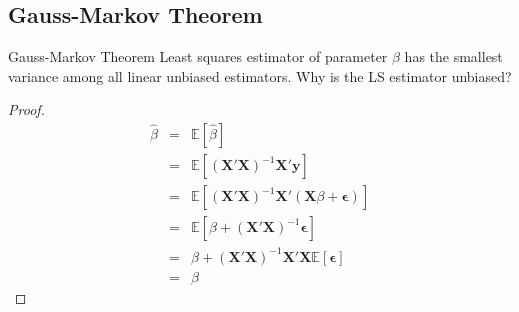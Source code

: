 \documentclass{beamer}
\newcommand{\E}{\mathbb{E}}
\begin{document}
\subsection{Gauss-Markov Theorem}
\begin{frame}{Gauss-Markov Theorem}
Least squares estimator of parameter $\beta$ has the smallest variance among all linear unbiased estimators.
Why is the LS estimator unbiased?
\begin{proof}
\begin{eqnarray*}
\hat{\beta}&=&\E[\hat{\beta}]\\
&=&\E[(\bm{X}'\bm{X})^{-1}\bm{X}'\bm{y}]\\
&=&\E[(\bm{X}'\bm{X})^{-1}\bm{X}'(\bm{X}\beta+\bm{\epsilon})]\\
&=&\E[\beta+(\bm{X}'\bm{X})^{-1}\bm{\epsilon}]\\
&=&\beta+(\bm{X}'\bm{X})^{-1}\bm{X}'\bm{X}\E[\bm{\epsilon}]\\
&=&\beta
\end{eqnarray*}
\end{proof}
\end{frame}
%
%
\end{document}
